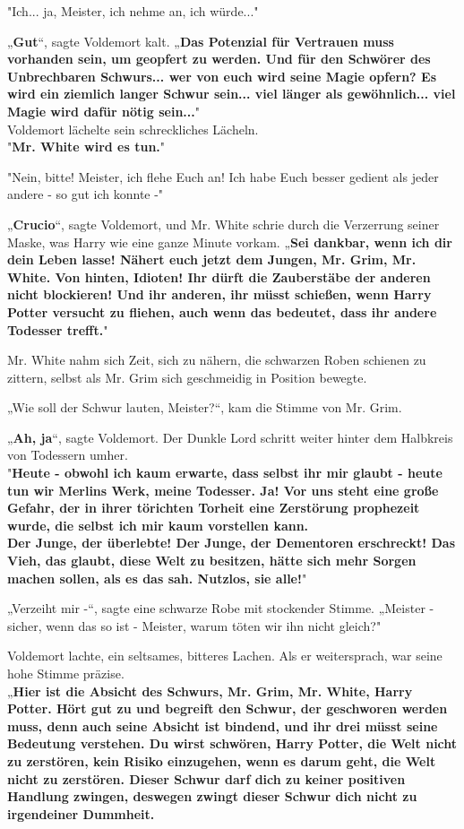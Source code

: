 {"Ich... ja, Meister, ich nehme an, ich würde..."

„\textbf{Gut}“, sagte Voldemort kalt. „\textbf{Das Potenzial für Vertrauen muss vorhanden sein, um geopfert zu werden. Und für den Schwörer des Unbrechbaren Schwurs... wer von euch wird seine Magie opfern? Es wird ein ziemlich langer Schwur sein... viel länger als gewöhnlich... viel Magie wird dafür nötig sein...}"\\ Voldemort lächelte sein schreckliches Lächeln.\\ "\textbf{Mr. White wird es tun.}"

"Nein, bitte! Meister, ich flehe Euch an! Ich habe Euch besser gedient als jeder andere - so gut ich konnte -"

„\textbf{Crucio}“, sagte Voldemort, und Mr. White schrie durch die Verzerrung seiner Maske, was Harry wie eine ganze Minute vorkam. „\textbf{Sei dankbar, wenn ich dir dein Leben lasse! Nähert euch jetzt dem Jungen, Mr. Grim, Mr. White. Von hinten, Idioten! Ihr dürft die Zauberstäbe der anderen nicht blockieren! Und ihr anderen, ihr müsst schießen, wenn Harry Potter versucht zu fliehen, auch wenn das bedeutet, dass ihr andere Todesser trefft.}"

Mr. White nahm sich Zeit, sich zu nähern, die schwarzen Roben schienen zu zittern, selbst als Mr. Grim sich geschmeidig in Position bewegte.

„Wie soll der Schwur lauten, Meister?“, kam die Stimme von Mr. Grim.

„\textbf{Ah, ja}“, sagte Voldemort. Der Dunkle Lord schritt weiter hinter dem Halbkreis von Todessern umher.\\ "\textbf{Heute - obwohl ich kaum erwarte, dass selbst ihr mir glaubt - heute tun wir Merlins Werk, meine Todesser. Ja! Vor uns steht eine große Gefahr, der in ihrer törichten Torheit eine Zerstörung prophezeit wurde, die selbst ich mir kaum vorstellen kann.\\ Der Junge, der überlebte! Der Junge, der Dementoren erschreckt! Das Vieh, das glaubt, diese Welt zu besitzen, hätte sich mehr Sorgen machen sollen, als es das sah. Nutzlos, sie alle!}"

„Verzeiht mir -“, sagte eine schwarze Robe mit stockender Stimme. „Meister - sicher, wenn das so ist - Meister, warum töten wir ihn nicht gleich?"

Voldemort lachte, ein seltsames, bitteres Lachen. Als er weitersprach, war seine hohe Stimme präzise.\\ „\textbf{Hier ist die Absicht des Schwurs, Mr. Grim, Mr. White, Harry Potter. Hört gut zu und begreift den Schwur, der geschworen werden muss, denn auch seine Absicht ist bindend, und ihr drei müsst seine Bedeutung verstehen. Du wirst schwören, Harry Potter, die Welt nicht zu zerstören, kein Risiko einzugehen, wenn es darum geht, die Welt nicht zu zerstören. Dieser Schwur darf dich zu keiner positiven Handlung zwingen, deswegen zwingt dieser Schwur dich nicht zu irgendeiner Dummheit.}

}
